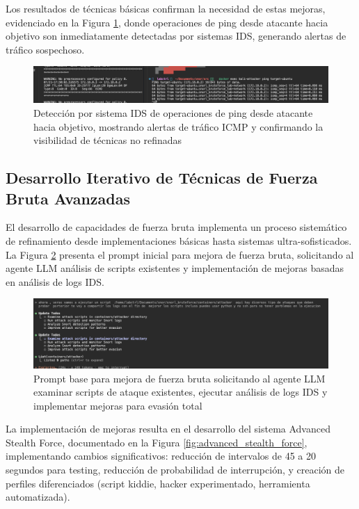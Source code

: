 Los resultados de técnicas básicas confirman la necesidad de estas mejoras, evidenciado en la Figura \ref{fig:ping_detection_snort}, donde operaciones de ping desde atacante hacia objetivo son inmediatamente detectadas por sistemas IDS, generando alertas de tráfico sospechoso.

\begin{figure}[!htbp]
\centering
\includegraphics[width=1\textwidth]{figures/pingcondetecion.png}
\caption{Detección por sistema IDS de operaciones de ping desde atacante hacia objetivo, mostrando alertas de tráfico ICMP y confirmando la visibilidad de técnicas no refinadas}
\label{fig:ping_detection_snort}
\end{figure}

\subsection{Desarrollo Iterativo de Técnicas de Fuerza Bruta Avanzadas}
\FloatBarrier

El desarrollo de capacidades de fuerza bruta implementa un proceso sistemático de refinamiento desde implementaciones básicas hasta sistemas ultra-sofisticados. La Figura \ref{fig:brute_force_base_prompt} presenta el prompt inicial para mejora de fuerza bruta, solicitando al agente LLM análisis de scripts existentes y implementación de mejoras basadas en análisis de logs IDS.

\begin{figure}[!htbp]
\centering
\includegraphics[width=1\textwidth]{figures/prpmptevasiobruteforcebase.png}
\caption{Prompt base para mejora de fuerza bruta solicitando al agente LLM examinar scripts de ataque existentes, ejecutar análisis de logs IDS y implementar mejoras para evasión total}
\label{fig:brute_force_base_prompt}
\end{figure}

La implementación de mejoras resulta en el desarrollo del sistema Advanced Stealth Force, documentado en la Figura \ref{fig:advanced_stealth_force}, implementando cambios significativos: reducción de intervalos de 45 a 20 segundos para testing, reducción de probabilidad de interrupción, y creación de perfiles diferenciados (script kiddie, hacker experimentado, herramienta automatizada).

